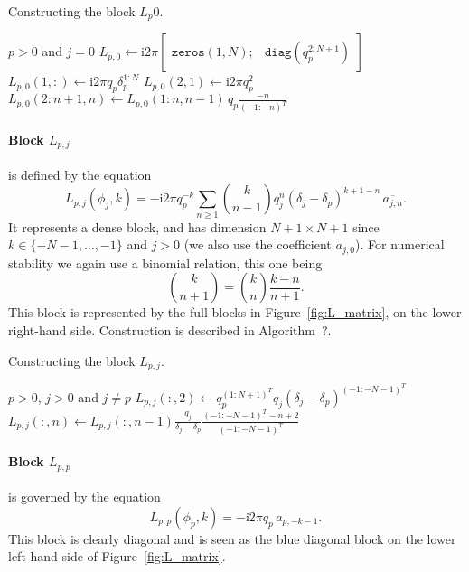 \documentclass[12pt,a4paper,fleqn]{article}
\newcommand{\conj}[1]{\overline{#1}}
\renewcommand{\i}{\mathrm{i}}
\begin{document}
\begin{algorithm}
  \caption{Constructing the block $L_p0$.}
  \label{alg:L_p0}
  \begin{algorithmic}
    \REQUIRE $p > 0$ and $j = 0$
      \STATE $L_{p,0} \leftarrow \i2\pi \begin{bmatrix} \mathtt{zeros}(1,N); & \mathtt{diag}(q_p^{2:N+1}) \end{bmatrix}$
    \ELSE[$\delta_p > 0$]
      \STATE $L_{p,0}(1,:) \leftarrow \i2\pi q_p \delta_p^{1:N}$
      \STATE $L_{p,0}(2,1) \leftarrow \i2\pi q_p^2$
        \STATE $L_{p,0}(2:n+1,n) \leftarrow L_{p,0}(1:n,n-1) \,q_p \frac{-n}{(-1:-n)^T}$
      \ENDFOR
    \ENDIF
  \end{algorithmic}
\end{algorithm}

\paragraph{Block $L_{p,j}$} is defined by the equation
\begin{equation}
  L_{p,j}(\phi_j,k) = -\i2\pi q_p^{-k} \sum_{n\ge 1} \binom{k}{n-1} q_j^n(\delta_j - \delta_p)^{k+1-n} \,\conj{a_{j,n}}.
  \label{eq:block_Lpj}
\end{equation}
It represents a dense block, and has dimension $N+1\times N+1$ since $k\in \{-N-1, \dots, -1\}$ and $j>0$ (we also use the coefficient $a_{j,0}$). For numerical stability we again use a binomial relation, this one being
\begin{equation}
  \binom{k}{n+1} = \binom{k}{n} \frac{k-n}{n+1}.
\end{equation}
This block is represented by the full blocks in Figure~\ref{fig:L_matrix}, on the lower right-hand side. Construction is described in Algorithm~?.

\begin{algorithm}
  \caption{Constructing the block $L_{p,j}$.}
  \label{alg:L_pj}
  \begin{algorithmic}
    \REQUIRE $p > 0$, $j>0$ and $j\ne p$
    \STATE $L_{p,j}(:,2) \leftarrow q_p^{(1:N+1)^T} q_j(\delta_j - \delta_p)^{(-1:-N-1)^T}$
    \STATE $L_{p,j}(:,n) \leftarrow L_{p,j}(:,n-1) \frac{q_j}{\delta_j - \delta_p} \frac{(-1:-N-1)^T - n+2}{(-1:-N-1)^T}$
    \ENDFOR
  \end{algorithmic}
\end{algorithm}

\paragraph{Block $L_{p,p}$} is governed by the equation
\begin{equation}
  L_{p,p}(\phi_p,k) = -\i2\pi q_p \,a_{p,-k-1}.
  \label{eq:block_Lpp}
\end{equation}
This block is clearly diagonal and is seen as the blue diagonal block on the lower left-hand side of Figure~\ref{fig:L_matrix}.
\end{document}
